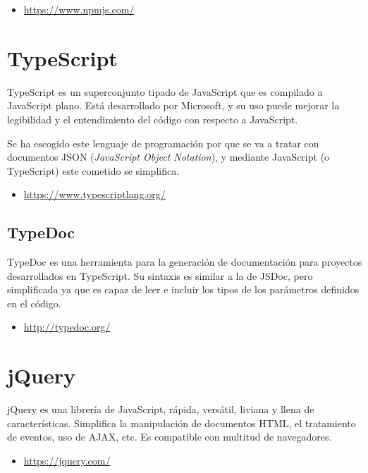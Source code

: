 \begin{itemize}
	\item \url{https://www.npmjs.com/}
\end{itemize}

\section{TypeScript}

TypeScript es un superconjunto tipado de JavaScript que es compilado a JavaScript plano. Está desarrollado por Microsoft, y su uso puede mejorar la legibilidad y el entendimiento del código con respecto a JavaScript.

Se ha escogido este lenguaje de programación por que se va a tratar con documentos JSON (\textit{JavaScript Object Notation}), y mediante JavaScript (o TypeScript) este cometido se simplifica.

\begin{itemize}
	\item \url{https://www.typescriptlang.org/}
\end{itemize}

\subsection{TypeDoc}

TypeDoc es una herramienta para la generación de documentación para proyectos desarrollados en TypeScript. Su sintaxis es similar a la de JSDoc, pero simplificada ya que es capaz de leer e incluir los tipos de los parámetros definidos en el código.

\begin{itemize}
	\item \url{http://typedoc.org/}
\end{itemize}

\section{jQuery}

jQuery es una librería de JavaScript, rápida, versátil, liviana y llena de características. Simplifica la manipulación de documentos HTML, el tratamiento de eventos, uso de AJAX, etc. Es compatible con multitud de navegadores.

\begin{itemize}
	\item \url{https://jquery.com/}
\end{itemize}


